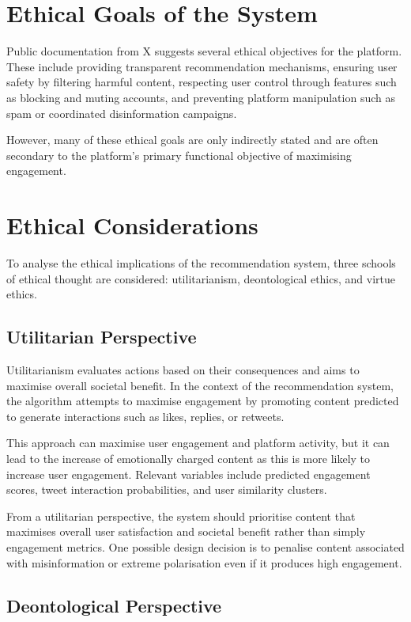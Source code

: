 \documentclass[]
{UCD_CS_41820_Report}
\begin{document}
\section{Ethical Goals of the System}

Public documentation from X suggests several ethical objectives for the platform. These include 
providing transparent recommendation mechanisms, ensuring user safety by filtering harmful content, 
respecting user control through features such as blocking and muting accounts, and preventing 
platform manipulation such as spam or coordinated disinformation campaigns.

However, many of these ethical goals are only indirectly stated and are often secondary to the 
platform's primary functional objective of maximising engagement.

\section{Ethical Considerations}

To analyse the ethical implications of the recommendation system, three schools of ethical thought 
are considered: utilitarianism, deontological ethics, and virtue ethics.

\subsection{Utilitarian Perspective}

Utilitarianism evaluates actions based on their consequences and aims to maximise overall societal 
benefit. In the context of the recommendation system, the algorithm attempts to maximise engagement 
by promoting content predicted to generate interactions such as likes, replies, or retweets.

This approach can maximise user engagement and platform activity, but it can lead to the 
increase of emotionally charged content as this is more likely to increase user engagement. Relevant variables include predicted engagement scores, tweet interaction probabilities, and user similarity clusters.

From a utilitarian perspective, the system should prioritise content that maximises overall user 
satisfaction and societal benefit rather than simply engagement metrics. One possible design 
decision is to penalise content associated with misinformation or extreme polarisation even if 
it produces high engagement.

\subsection{Deontological Perspective}
\end{document}
